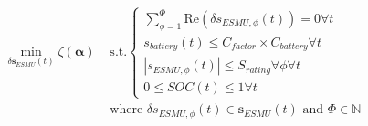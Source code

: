 \begin{equation}
\begin{split}
	\min_{\delta \textbf{s}_{ESMU}(t)} \zeta(\boldsymbol{\alpha})
	&\text{ s.t.}
	\begin{cases}
		\sum_{\phi=1}^{\Phi} \text{Re} \left(\delta s_{ESMU,\phi}(t)\right) = 0 \forall t\\
		s_{battery}(t) \leq C_{factor}\times C_{battery} \forall t\\
		\left|s_{ESMU,\phi}(t)\right| \leq S_{rating} \forall \phi \forall t\\
		0 \leq SOC(t) \leq 1 \forall t
	\end{cases}\\
	&\text{ where } \delta s_{ESMU,\phi}(t) \in \textbf{s}_{ESMU}(t) \text{ and } \Phi \in \mathbb{N}
\end{split}
\label{ch1:equ:closed-loop-minimisation}
\end{equation}
